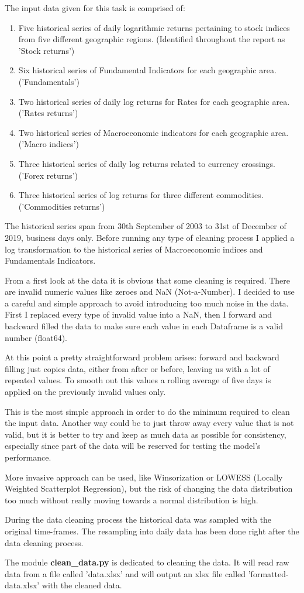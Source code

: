 The input data given for this task is comprised of:
\begin{enumerate}
    \item Five historical series of daily logarithmic returns pertaining to stock indices from five different geographic regions. (Identified throughout the report as 'Stock returns')
    \item Six historical series of Fundamental Indicators for each geographic area. ('Fundamentals')
    \item Two historical series of daily log returns for Rates for each geographic area. ('Rates returns')
    \item Two historical series of Macroeconomic indicators for each geographic area. ('Macro indices')
    \item Three historical series of daily log returns related to currency crossings. ('Forex returns')
    \item Three historical series of log returns for three different commodities. ('Commodities returns')
\end{enumerate}
The historical series span from 30th September of 2003 to 31st of December of 2019, business days only. Before running any type of cleaning process I applied a log transformation to the historical series of Macroeconomic indices and Fundamentals Indicators.


From a first look at the data it is obvious that some cleaning is required. There are invalid numeric values like zeroes and NaN (Not-a-Number). I decided to use a careful and simple approach to avoid introducing too much noise in the data. First I replaced every type of invalid value into a NaN, then I forward and backward filled the data to make sure each value in each Dataframe is a valid number (float64). 


At this point a pretty straightforward problem arises: forward and backward filling just copies data, either from after or before, leaving us with a lot of repeated values. To smooth out this values a rolling average of five days is applied on the previously invalid values only.


This is the most simple approach in order to do the minimum required to clean the input data. Another way could be to just throw away every value that is not valid, but it is better to try and keep as much data as possible for consistency, especially since part of the data will be reserved for testing the model's performance.


More invasive approach can be used, like Winsorization or LOWESS (Locally Weighted Scatterplot Regression), but the risk of changing the data distribution too much without really moving towards a normal distribution is high.

During the data cleaning process the historical data was sampled with the original time-frames. The resampling into daily data has been done right after the data cleaning process.

The module \textbf{clean\_data.py} is dedicated to cleaning the data. It will read raw data from a file called 'data.xlsx' and will output an xlsx file called 'formatted-data.xlsx' with the cleaned data.